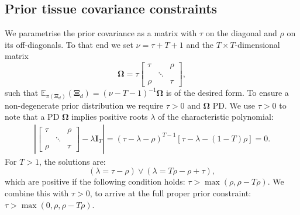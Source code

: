 \documentclass[a4paper,hidelinks]{article}\usepackage[]{graphicx}\usepackage[]{color}
\newcommand{\I}{\mathbf{I}}
\newcommand{\0}{\bm{0}}
\newcommand{\E}{\mathbb{E}}
\newcommand{\trace}{\text{tr}}
\renewcommand{\(}{\left(}
\renewcommand{\)}{\right)}
\renewcommand{\[}{\left[}
\renewcommand{\]}{\right]}
\begin{document}
\begin{appendix}
		\section{Prior tissue covariance constraints}\label{app:priortissuecovariance}
		
		We parametrise the prior covariance as a matrix with $\tau$ on the diagonal and $\rho$ on its off-diagonals. To that end we set $\nu = \tau + T + 1$ and the $T \times T$-dimensional matrix
		$$
		\bm{\Omega} = \tau \begin{bmatrix}
		\tau &  & \rho \\
		& \ddots &  \\
		\rho & & \tau
		\end{bmatrix},
		$$
		such that $\E_{\pi(\mathbf{\Xi}_d)} (\mathbf{\Xi}_d) = (\nu - T - 1)^{-1} \bm{\Omega}$ is of the desired form. To ensure a non-degenerate prior distribution we require $\tau > 0$ and $\bm{\Omega}$ PD. We use $\tau > 0$ to note that a PD $\bm{\Omega}$ implies positive roots $\lambda$ of the characteristic polynomial:
		\begin{align*}
		\left| \begin{bmatrix}
		\tau &  & \rho \\
		& \ddots &  \\
		\rho & & \tau
		\end{bmatrix} -\lambda \I_T \right| = (\tau - \lambda - \rho)^{T-1}[\tau - \lambda - (1-T)\rho] = 0.
		\end{align*}
		For $T > 1$, the solutions are:
		$$
		(\lambda = \tau - \rho) \lor (\lambda = T \rho - \rho + \tau),
		$$
		which are positive if the following condition holds: $\tau > \max(\rho,\rho - T \rho)$. We combine this with $\tau > 0$, to arrive at the full proper prior constraint: $\tau > \max(0,\rho,\rho - T \rho)$. 
		

\end{appendix}
\end{document}
